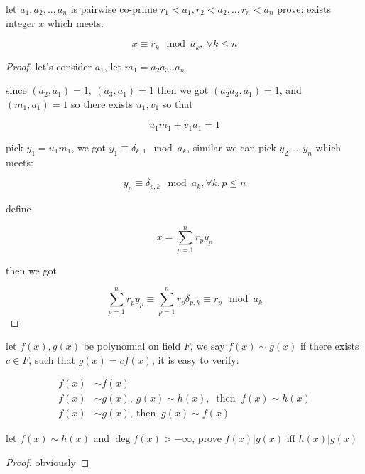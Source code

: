 \begin{exercise}
    let $a_1,a_2,..,a_n$ is pairwise co-prime $r_1 < a_1,r_2 < a_2, .., r_n < a_n$ 
    prove: exists integer $x$ which meets:

    \[
        x \equiv r_k \mod a_k,\: \forall k \le n
    \]

\end{exercise}

\begin{proof}
    let's consider $a_1$, let $m_1 = a_2a_3..a_n$

    since $(a_2, a_1) = 1,\: (a_3,a_1) = 1$ then we got $(a_2a_3,a_1) = 1$, and $(m_1, a_1) = 1$
    so there exists $u_1, v_1$ so that

    \[
        u_1m_1 + v_1a_1  = 1
    \]

    pick $y_1 = u_1m_1$, we got $y_1 \equiv \delta_{k,1} \mod a_k$, similar we can pick $y_2,..,y_n$ which meets:

    \[
        y_p \equiv \delta_{p,k} \mod a_k, \forall k,p \le n
    \]

    define 

    \[
        x = \sum_{p=1}^{n}r_py_p
    \]

    then we got

    \[
        \sum_{p=1}^{n}r_py_p \equiv \sum_{p=1}^{n}r_p\delta_{p,k}  \equiv r_p \mod a_k
    \]
\end{proof}

\begin{definition}
    let $f(x), g(x)$ be polynomial on field $F$, we say $f(x) \sim g(x)$ if there exists $c \in F$, such that $g(x) = cf(x)$,
    it is easy to verify:

    \begin{align*}
        f(x) & \sim f(x) \\
        f(x) & \sim g(x),\: g(x) \sim h(x),\: \text{ then } \: f(x) \sim h(x) \\
        f(x) & \sim g(x),\: \text{then } \: g(x) \sim f(x)
    \end{align*}
\end{definition}

\begin{exercise}
    let $f(x) \sim h(x)$ and $\deg f(x) > -\infty$, prove $f(x) | g(x)$ iff $h(x) | g(x)$
\end{exercise}

\begin{proof}
    obviously
\end{proof}

